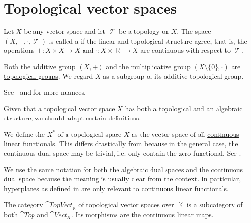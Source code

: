\section{Topological vector spaces}\label{sec:topological_vector_spaces}

\begin{definition}\label{def:topological_vector_space}
  Let \( X \) be any vector space and let \( \mscrT \) be a topology on \( X \). The space \( (X, +, \cdot, \mscrT) \) is called a  if the linear and topological structure agree, that is, the operations \( +: X \times X \to X \) and \( \cdot: X \times \BbbR \to X \) are continuous with respect to \( \mscrT \).

  Both the additive group \( (X, +) \) and the multiplicative group \( (X \setminus \{ 0 \}, \cdot) \) are \hyperref[def:topological_group]{topological groups}. We regard \( X \) as a subgroup of its additive topological group.

  See ,  and  for more nuances.
\end{definition}

Given that a topological vector space \( X \) has both a topological and an algebraic structure, we should adapt certain definitions.

\begin{definition}\label{def:continuous_dual_space}
  We define the  \( X^* \) of a topological space \( X \) as the vector space of all \hyperref[def:global_continuity]{continuous} linear functionals. This differs drastically from  because in the general case, the continuous dual space may be trivial, i.e. only contain the zero functional. See .

  We use the same notation for both the algebraic dual spaces and the continuous dual space because the meaning is usually clear from the context. In particular, hyperplanes as defined in  are only relevant to continuous linear functionals.
\end{definition}

\begin{definition}\label{def:category_of_topological_vector_spaces}
  The category \( \cat{TopVect}_{\BbbK} \) of topological vector spaces over \( \BbbK \) is a subcategory of both \( \cat{Top} \) and \( \cat{Vect}_K \). Its morphisms are the \hyperref[def:global_continuity]{continuous} linear \hyperref[def:semimodule/homomorphism]{maps}.
\end{definition}


